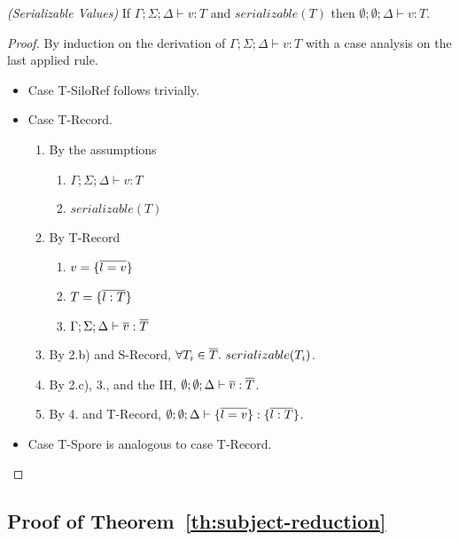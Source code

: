 \begin{thmun}
\emph{(Serializable Values)}
If $\Gamma ; \Sigma ; \Delta \vdash v : T$ and $serializable(T)$ then $\emptyset ; \emptyset ; \Delta \vdash v : T$.
\end{thmun}
\begin{proof}
By induction on the derivation of $\Gamma ; \Sigma ; \Delta \vdash v : T$ with a case analysis on the last applied rule.

\begin{itemize}
\item Case T-SiloRef follows trivially.

\item Case T-Record.
\begin{enumerate}
\item By the assumptions
  \begin{enumerate}[label=(\alph*)]
  \item $\Gamma ; \Sigma ; \Delta \vdash v : T$
  \item $serializable(T)$
  \end{enumerate}
\item By T-Record
  \begin{enumerate}[label=(\alph*)]
  \item $v = \{\overline{l = v}\}$
  \item $T = \{\overline{l : T}\}$
  \item $\Gamma ; \Sigma ; \Delta \vdash \overline{v} : \overline{T}$
  \end{enumerate}
\item By 2.b) and S-Record, $\forall T_i \in \overline{T}.~serializable(T_i)$.
\item By 2.c), 3., and the IH, $\emptyset ; \emptyset ; \Delta \vdash \overline{v} : \overline{T}$.
\item By 4. and T-Record, $\emptyset ; \emptyset ; \Delta \vdash \{\overline{l = v}\} : \{\overline{l : T}\}$.
\end{enumerate}

\item Case T-Spore is analogous to case T-Record.
\end{itemize}
\end{proof}

\subsection{Proof of Theorem~\ref{th:subject-reduction}}\label{app:subject-reduction}


